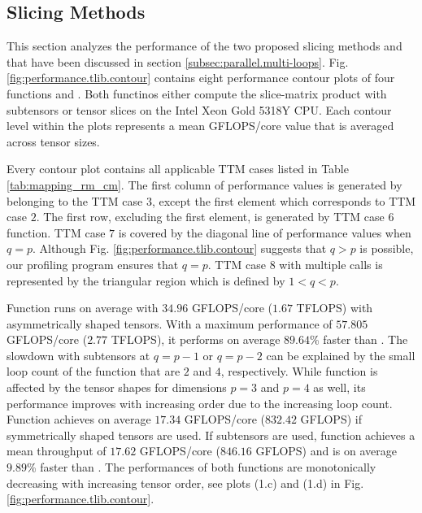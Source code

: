 \subsection{Slicing Methods}
\label{subsec:results.slicing-methods}
This section analyzes the performance of the two proposed slicing methods  and  that have been discussed in section \ref{subsec:parallel.multi-loops}.
Fig. \ref{fig:performance.tlib.contour} contains eight performance contour plots of four  functions  and .
Both functinos either compute the slice-matrix product with subtensors  or tensor slices  on the Intel Xeon Gold 5318Y CPU.
Each contour level within the plots represents a mean GFLOPS/core value that is averaged across tensor sizes.

Every contour plot contains all applicable TTM cases listed in Table \ref{tab:mapping_rm_cm}.
The first column of performance values is generated by  belonging to the TTM case $3$, except the first element which corresponds to TTM case $2$.
The first row, excluding the first element, is generated by TTM case $6$ function.
TTM case $7$ is covered by the diagonal line of performance values when $q = p$.  
Although Fig. \ref{fig:performance.tlib.contour} suggests that $q>p$ is possible, our profiling program ensures that $q=p$.
TTM case $8$ with multiple  calls is represented by the triangular region which is defined by $1<q<p$.


Function  runs on average with $34.96$ GFLOPS/core ($1.67$ TFLOPS) with asymmetrically shaped tensors.
With a maximum performance of $57.805$ GFLOPS/core ($2.77$ TFLOPS), it performs on average $89.64$\% faster than .
The slowdown with subtensors at $q=p-1$ or $q=p-2$ can be explained by the small loop count of the function that are $2$ and $4$, respectively.
While function  is affected by the tensor shapes for dimensions $p=3$ and $p=4$ as well, its performance improves with increasing order due to the increasing loop count.
Function  achieves on average $17.34$ GFLOPS/core ($832.42$ GFLOPS) if symmetrically shaped tensors are used.
If subtensors are used, function  achieves a mean throughput of $17.62$ GFLOPS/core ($846.16$ GFLOPS) and is on average $9.89$\% faster than .
The performances of both functions are monotonically decreasing with increasing tensor order, see plots (1.c) and (1.d) in Fig. \ref{fig:performance.tlib.contour}.


